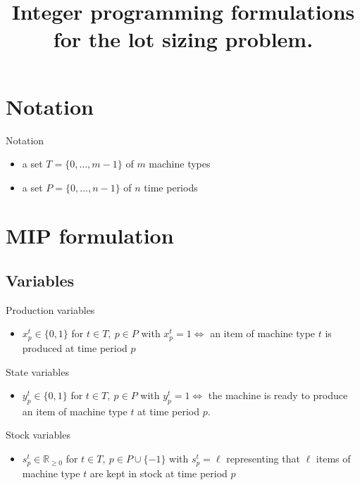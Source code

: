 \documentclass{beamer}
\title{Integer programming formulations for the lot sizing problem.}
\begin{document}
\begin{frame}
  \tableofcontents
\end{frame}

\section{Notation}
\begin{frame}{Notation}
    \begin{itemize}
      \item a set $T = \{0,\ldots,m-1\}$ of $m$ machine types
      \item a set $P = \{0,\ldots,n-1\}$ of $n$ time periods
  \end{itemize}
  \end{frame}

\section{MIP formulation}
\subsection{Variables}
\begin{frame}{Production variables}
    \begin{itemize}
    \item $x^t_p \in \{0,1\}$ for $t \in T,~p \in P$ with $x^t_p = 1
      \Leftrightarrow$ an item of machine type $t$ is produced at time
      period $p$
    \end{itemize}
  \end{frame}

  \begin{frame}{State variables}
    \begin{itemize}
      \item $y^t_p \in \{0,1\}$ for $t \in T,~p \in P$ with $y^t_p = 1
        \Leftrightarrow$ the machine is ready to produce an item of
        machine type $t$ at time period $p$.
    \end{itemize}
  \end{frame}

  \begin{frame}{Stock variables}
    \begin{itemize}
      \item $s^t_p \in \mathbb{R}_{\geq0}$ for $t \in T,~p \in P \cup
        \{-1\}$ with $s^t_p = \ell$ representing that $\ell$ items of
        machine type $t$ are kept in stock at time period $p$
    \end{itemize}
  \end{frame}
\end{document}
